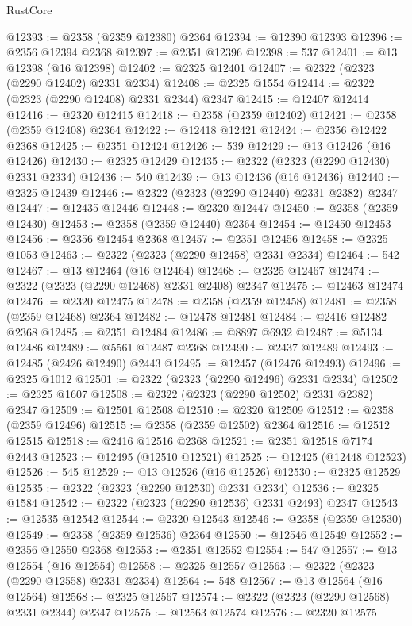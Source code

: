 \begin{lexlean}{RustCore}
\begin{coremodule}
@12393 := @2358 (@2359 @12380) @2364
@12394 := @12390 @12393
@12396 := @2356 @12394 @2368
@12397 := @2351 @12396
@12398 := 537
@12401 := @13 @12398 (@16 @12398)
@12402 := @2325 @12401
@12407 := @2322 (@2323 (@2290 @12402) @2331 @2334)
@12408 := @2325 @1554
@12414 := @2322 (@2323 (@2290 @12408) @2331 @2344) @2347
@12415 := @12407 @12414
@12416 := @2320 @12415
@12418 := @2358 (@2359 @12402)
@12421 := @2358 (@2359 @12408) @2364
@12422 := @12418 @12421
@12424 := @2356 @12422 @2368
@12425 := @2351 @12424
@12426 := 539
@12429 := @13 @12426 (@16 @12426)
@12430 := @2325 @12429
@12435 := @2322 (@2323 (@2290 @12430) @2331 @2334)
@12436 := 540
@12439 := @13 @12436 (@16 @12436)
@12440 := @2325 @12439
@12446 := @2322 (@2323 (@2290 @12440) @2331 @2382) @2347
@12447 := @12435 @12446
@12448 := @2320 @12447
@12450 := @2358 (@2359 @12430)
@12453 := @2358 (@2359 @12440) @2364
@12454 := @12450 @12453
@12456 := @2356 @12454 @2368
@12457 := @2351 @12456
@12458 := @2325 @1053
@12463 := @2322 (@2323 (@2290 @12458) @2331 @2334)
@12464 := 542
@12467 := @13 @12464 (@16 @12464)
@12468 := @2325 @12467
@12474 := @2322 (@2323 (@2290 @12468) @2331 @2408) @2347
@12475 := @12463 @12474
@12476 := @2320 @12475
@12478 := @2358 (@2359 @12458)
@12481 := @2358 (@2359 @12468) @2364
@12482 := @12478 @12481
@12484 := @2416 @12482 @2368
@12485 := @2351 @12484
@12486 := @8897 @6932
@12487 := @5134 @12486
@12489 := @5561 @12487 @2368
@12490 := @2437 @12489
@12493 := @12485 (@2426 @12490) @2443
@12495 := @12457 (@12476 @12493)
@12496 := @2325 @1012
@12501 := @2322 (@2323 (@2290 @12496) @2331 @2334)
@12502 := @2325 @1607
@12508 := @2322 (@2323 (@2290 @12502) @2331 @2382) @2347
@12509 := @12501 @12508
@12510 := @2320 @12509
@12512 := @2358 (@2359 @12496)
@12515 := @2358 (@2359 @12502) @2364
@12516 := @12512 @12515
@12518 := @2416 @12516 @2368
@12521 := @2351 @12518 @7174 @2443
@12523 := @12495 (@12510 @12521)
@12525 := @12425 (@12448 @12523)
@12526 := 545
@12529 := @13 @12526 (@16 @12526)
@12530 := @2325 @12529
@12535 := @2322 (@2323 (@2290 @12530) @2331 @2334)
@12536 := @2325 @1584
@12542 := @2322 (@2323 (@2290 @12536) @2331 @2493) @2347
@12543 := @12535 @12542
@12544 := @2320 @12543
@12546 := @2358 (@2359 @12530)
@12549 := @2358 (@2359 @12536) @2364
@12550 := @12546 @12549
@12552 := @2356 @12550 @2368
@12553 := @2351 @12552
@12554 := 547
@12557 := @13 @12554 (@16 @12554)
@12558 := @2325 @12557
@12563 := @2322 (@2323 (@2290 @12558) @2331 @2334)
@12564 := 548
@12567 := @13 @12564 (@16 @12564)
@12568 := @2325 @12567
@12574 := @2322 (@2323 (@2290 @12568) @2331 @2344) @2347
@12575 := @12563 @12574
@12576 := @2320 @12575

\end{coremodule}
\end{lexlean}
